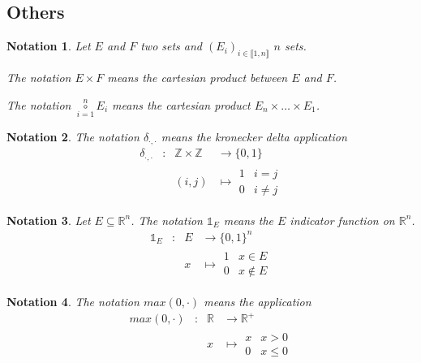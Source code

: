 \documentclass[11pt,en]{elegantpaper}
\newtheorem{notation}{Notation}
\newcommand{\Real}{\mathbb{R}}
\begin{document}
\subsection{Others}

\begin{notation}
  Let $E$ and $F$ two sets and $(E_i)_{i \in \llbracket 1,n \rrbracket}$ $n$ sets. \par
  The notation $E \times F$ means the cartesian product between $E$ and $F$. \par
  The notation $\underset{i=1}{\overset{n}\circ} E_i$ means the cartesian product $E_n \times \ldots \times E_1$.
\end{notation}

\begin{notation}
  The notation $\delta_{\cdot,\cdot}$ means the kronecker delta application \begin{equation*}
    \begin{array}{llll}
      \delta_{\cdot,\cdot} & : & \mathbb{Z} \times \mathbb{Z} & \longrightarrow \{0,1\} \\
      &   & (i,j) & \longmapsto \begin{array}{ll}
        1 & i = j \\
        0 & i \neq j
      \end{array}
    \end{array}
  \end{equation*}
\end{notation}

\begin{notation}
  Let $E \subseteq \Real^n$. The notation $\mathbb{1}_E$ means the $E$ indicator function on $\Real^n$.
  \begin{equation*}
    \begin{array}{llll}
      \mathbb{1}_E & : & E & \longrightarrow \{0,1\}^n \\
      &   & x & \longmapsto \begin{array}{ll}
        1 & x \in E \\
        0 & x \notin E
      \end{array}
    \end{array}
  \end{equation*}
\end{notation}

\begin{notation}
  The notation $max(0,\cdot)$ means the application
  \begin{equation*}
    \begin{array}{llll}
      max(0,\cdot) & : & \Real & \longrightarrow \Real^+ \\
      &   & x & \longmapsto \begin{array}{ll}
        x & x > 0 \\
        0 & x \leq 0
      \end{array}
    \end{array}
  \end{equation*}
\end{notation}
\end{document}
